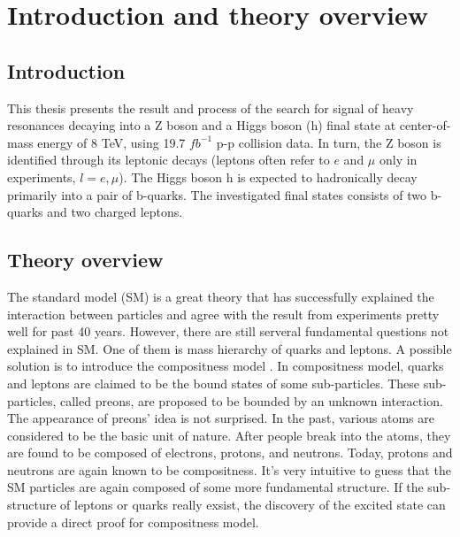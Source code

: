 \chapter{Introduction and theory overview}

\section{Introduction}
This thesis presents the result and process of the search for signal of heavy resonances decaying into a Z boson and a Higgs boson (h) final state at center-of-mass energy of 8 TeV, using 19.7 $fb^{-1}$ p-p collision data. In turn, the Z boson is identified through its leptonic decays (leptons often refer to $e$ and $\mu$ only in experiments, $l = e, \mu$). The Higgs boson h is expected to hadronically decay primarily into a pair of b-quarks. The investigated final states consists of two b-quarks and two charged leptons.



\section{Theory overview}
The standard model (SM) is a great theory that has successfully explained the interaction between particles and agree with the result from experiments pretty well for past 40 
years. However, there are still serveral fundamental questions not explained in SM. One of them is mass hierarchy of quarks and leptons. 
\newline A possible solution is to introduce the compositness model \cite{preons-idea, compositeness, eichten}.  
In compositness model, quarks and leptons are claimed to be the bound states of some sub-particles. These sub-particles, called preons,  
are proposed to be bounded by an unknown interaction. The appearance of preons' idea is not surprised. In the past, various atoms are considered to be the basic unit of nature. After people break into the atoms, 
they are found to be composed of electrons, protons, and neutrons. Today, protons and neutrons are again known to be compositness. It's very intuitive to guess that the SM particles are again composed of some more fundamental 
structure. If the sub-structure of leptons or quarks really exsist, the discovery of the excited state can provide a direct proof for compositness model.  

